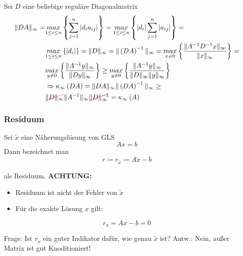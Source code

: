 Sei $D$ eine beliebige reguläre Diagonalmatrix
\begin{equation*}
\begin{aligned}
  \|DA\|_\infty = &\underset{1 \leq i \leq n}{max} \left\{\sum\limits_{j=1}^{n}{\left|d_ia_{ij}\right|}\right\} =
  \underset{1 \leq i \leq n}{max}\left\{\left|d_i\right|\sum\limits_{j=1}^{n}{\left|a_{ij}\right|}\right\} = \\
  &\underset{1 \leq i \leq n}{max}\left\{\left|d_i\right|\right\} = \|D\|_\infty = 
  \|\left(DA\right)^{-1}\|_\infty = \underset{x \neq 0}{max}\left\{\frac{\|A^{-1}D^{-1}x\|_\infty}{\|x\|_\infty}\right\} = \\
  &\underset{y \neq 0}{max}\left\{\frac{\|A^{-1}y\|_\infty}{\|Dy\|_\infty}\right\} \geq \underset{y \neq 0}{max}\left\{\frac{\|A^{-1}y\|_\infty}{\|D\|_\infty\|y\|_\infty}   \right\} \\
  &\Rightarrow \kappa_\infty\left(DA\right) = \|DA\|_\infty \|\left(DA\right)^{-1}\|_\infty \geq \\
  &\hcancel{$\|D\|_\infty$} \|A^{-1}\|_\infty \hcancel{$\|D\|_{\infty}^{-1}$} = \kappa_\infty\left(A\right)
\end{aligned}
\end{equation*}

\subsubsection{Residuum}
Sei $\widetilde
{x}$ eine Näherungslösung von GLS
\begin{equation*}
Ax=b
\end{equation*}
Dann bezeichnet man
\begin{equation*}
r \coloneqq r_{\widetilde{x}} \coloneqq A\widetilde{x} - b
\end{equation*}

als Residuum.
\textbf{ACHTUNG:}
\begin{itemize}
  \item{Residuum ist nicht der Fehler von $\widetilde{x}$}
	\item{Für die exakte Lösung $x$ gilt:}
\end{itemize}
\begin{equation*}
r_x = Ax - b = 0
\end{equation*}

Frage: Ist $r_{\widetilde{x}}$ ein guter Indikator dafür, wie genau $\widetilde{x}$ ist?
Antw.: Nein, außer Matrix ist gut Knoditioniert!

